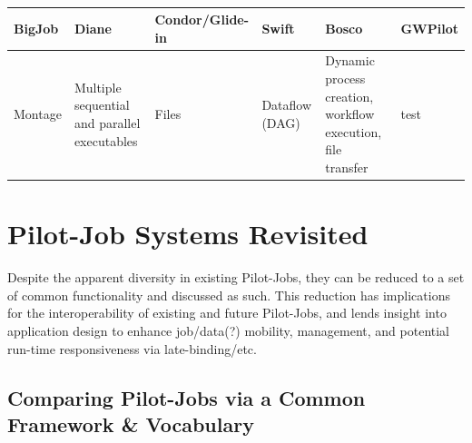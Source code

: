 \documentclass{sig-alternate}
\begin{document}
\begin{landscape}
\begin{table}
\begin{center}
\begin{footnotesize}
\begin{tabular}{|p{3.0cm}|p{3.5cm}|p{2.3cm}|p{1.9cm}|p{3.7cm}|p{2.5cm}|}
\hline {\bf BigJob}
& {\bf Diane}
& {\bf Condor/Glide-in}
& {\bf Swift}
& {\bf Bosco}
& {\bf GWPilot}
\\
\hline

Montage
& Multiple sequential and parallel executables
& Files
& Dataflow (DAG)
& Dynamic process creation, workflow execution, file transfer
& test
\\
\hline

\end{tabular}
\end{footnotesize}
\caption{\label{Tab:AppChars} }
\end{center}
\end{table}
\end{landscape}

\section{Pilot-Job Systems Revisited}
Despite the apparent diversity in existing Pilot-Jobs,
they can be reduced to a set of common functionality and
discussed as such.  This reduction has implications
for the interoperability of existing and future Pilot-Jobs, and
lends insight into application design to enhance job/data(?)
mobility, management, and potential run-time responsiveness via
late-binding/etc.
\subsection{Comparing Pilot-Jobs via a Common Framework \& Vocabulary}
\end{document}
